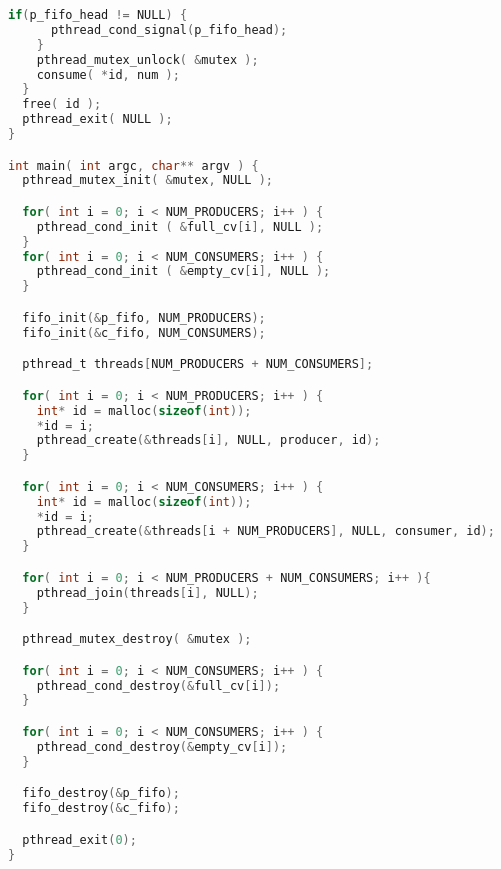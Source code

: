 \begin{lstlisting}[language=C]
    if(p_fifo_head != NULL) {
      pthread_cond_signal(p_fifo_head);
    }
    pthread_mutex_unlock( &mutex );
    consume( *id, num );
  }
  free( id );
  pthread_exit( NULL );
}

int main( int argc, char** argv ) {
  pthread_mutex_init( &mutex, NULL );

  for( int i = 0; i < NUM_PRODUCERS; i++ ) {
    pthread_cond_init ( &full_cv[i], NULL );
  }
  for( int i = 0; i < NUM_CONSUMERS; i++ ) {
    pthread_cond_init ( &empty_cv[i], NULL );
  }

  fifo_init(&p_fifo, NUM_PRODUCERS);
  fifo_init(&c_fifo, NUM_CONSUMERS);

  pthread_t threads[NUM_PRODUCERS + NUM_CONSUMERS];

  for( int i = 0; i < NUM_PRODUCERS; i++ ) {
    int* id = malloc(sizeof(int));
    *id = i;
    pthread_create(&threads[i], NULL, producer, id);
  }

  for( int i = 0; i < NUM_CONSUMERS; i++ ) {
    int* id = malloc(sizeof(int));
    *id = i;
    pthread_create(&threads[i + NUM_PRODUCERS], NULL, consumer, id);
  }

  for( int i = 0; i < NUM_PRODUCERS + NUM_CONSUMERS; i++ ){
    pthread_join(threads[i], NULL);
  }

  pthread_mutex_destroy( &mutex );

  for( int i = 0; i < NUM_CONSUMERS; i++ ) {
    pthread_cond_destroy(&full_cv[i]);
  }

  for( int i = 0; i < NUM_CONSUMERS; i++ ) {
    pthread_cond_destroy(&empty_cv[i]);
  }

  fifo_destroy(&p_fifo);
  fifo_destroy(&c_fifo);

  pthread_exit(0);
}
\end{lstlisting}




